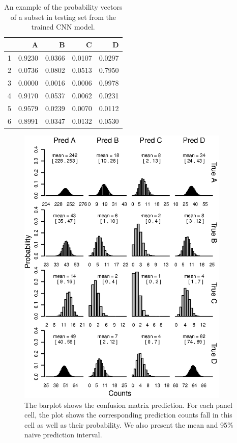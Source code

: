 \documentclass[12pt]{article}
\begin{document}
\begin{table}%
\begin{center}
\caption{An example of the probability vectors of a subset in testing set from the trained CNN model.}\label{tbl:elpmat}
\begin{tabular}{rrrrr}
  \hline\hline
 & A & B & C & D \\
  \hline
1 & 0.9230 & 0.0366 & 0.0107 & 0.0297 \\
  2 & 0.0736 & 0.0802 & 0.0513 & 0.7950 \\
  3 & 0.0000 & 0.0016 & 0.0006 & 0.9978 \\
  4 & 0.9170 & 0.0537 & 0.0062 & 0.0231 \\
  5 & 0.9579 & 0.0239 & 0.0070 & 0.0112 \\
  6 & 0.8991 & 0.0347 & 0.0132 & 0.0530 \\
   \hline\hline
\end{tabular}
\end{center}
\end{table}


\begin{figure}
\begin{center}
	\includegraphics[width=0.9\textwidth]{figures/Confusionbar.eps}
	\caption{The barplot shows the confusion matrix prediction. For each panel cell, the plot shows the corresponding prediction counts fall in this cell as well as their probability. We also present the mean and 95\% naive prediction interval.}
	\label{fig:confusion.hist}
\end{center}
\end{figure}
\end{document}
